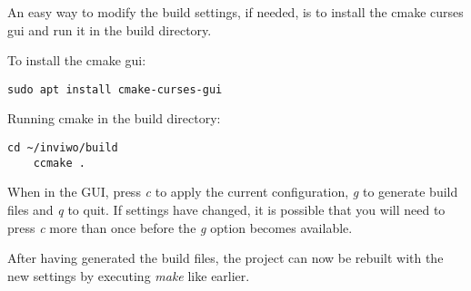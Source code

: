 An easy way to modify the build settings, if needed, is to install
the cmake curses gui and run it in the build directory.

To install the cmake gui:
\begin{lstlisting}[frame = single, breaklines = true]
    sudo apt install cmake-curses-gui
\end{lstlisting}

Running cmake in the build directory:
\begin{lstlisting}[frame = single, breaklines = true]
    cd ~/inviwo/build
    ccmake .
\end{lstlisting}

When in the GUI, press \emph{c} to apply the current configuration,
\emph{g} to generate build files and \emph{q} to quit. If settings
have changed, it is possible that you will need to press \emph{c} more
than once before the \emph{g} option becomes available.

After having generated the build files, the project can now be rebuilt
with the new settings by executing \emph{make} like earlier.